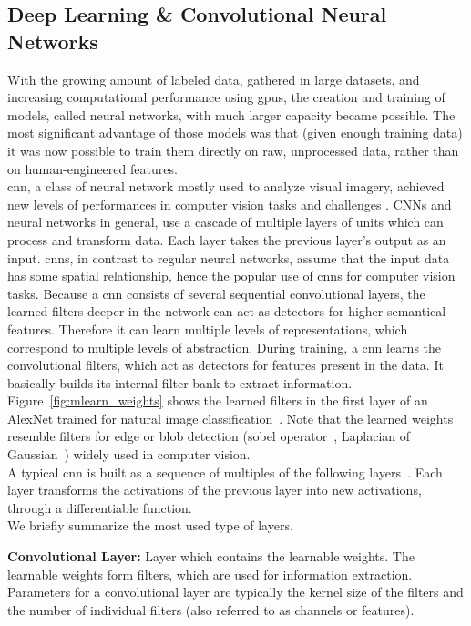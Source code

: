 \subsection{Deep Learning \& Convolutional Neural Networks}
With the growing amount of labeled data, gathered in large datasets, and increasing computational performance using \gls{gpu}s, the creation and training of models, called neural networks, with much larger capacity became possible. The most significant advantage of those models was that (given enough training data) it was now possible to train them directly on raw, unprocessed data, rather than on human-engineered features.\\
\gls{cnn}, a class of neural network mostly used to analyze visual imagery, achieved new levels of performances in computer vision tasks and challenges \cite{Krizhevsky2012ImageNetNetworks,Simonyan2014VeryRecognition,Szegedy2014GoingConvolutions,He2015DeepRecognition,Zeiler2014VisualizingNetworks}. 
CNNs and neural networks in general, use a cascade of multiple layers of units which can process and transform data. Each layer takes the previous layer's output as an input. \gls{cnn}s, in contrast to regular neural networks, assume that the input data has some spatial relationship, hence the popular use of \gls{cnn}s for computer vision tasks. Because a \gls{cnn} consists of several sequential convolutional layers, the learned filters deeper in the network can act as detectors for higher semantical features. Therefore it can learn multiple levels of representations, which correspond to multiple levels of abstraction. During training, a \gls{cnn} learns the convolutional filters, which act as detectors for features present in the data. It basically builds its internal filter bank to extract information. Figure~\ref{fig:mlearn_weights} shows the learned filters in the first layer of an AlexNet trained for natural image classification~\cite{Russakovsky2015ImageNetChallenge}. Note that the learned weights resemble filters for edge or blob detection (sobel operator~\cite{Sobel1990AnOperator}, Laplacian of Gaussian~\cite{Marr187}) widely used in computer vision.\\
A typical \gls{cnn} is built as a sequence of multiples of the following layers~\cite{KarpathyStanfordRecognition}. Each layer transforms the activations of the previous layer into new activations, through a differentiable function.\\
We briefly summarize the most used type of layers.

\textbf{Convolutional Layer:} Layer which contains the learnable weights. The learnable weights form filters, which are used for information extraction. Parameters for a convolutional layer are typically the kernel size of the filters and the number of individual filters (also referred to as channels or features).\\

